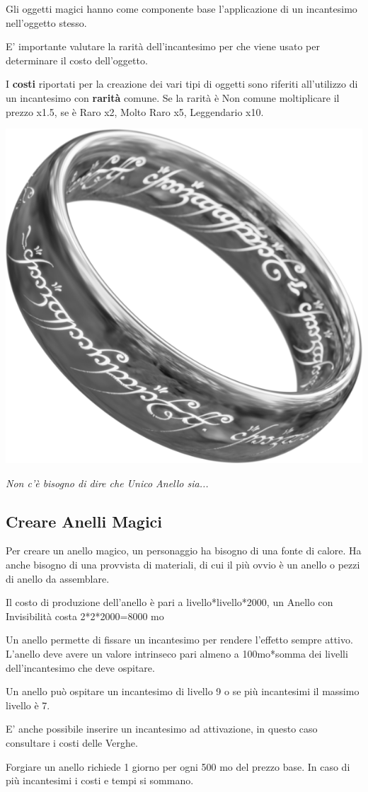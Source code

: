\begin{multicols}{2}
Gli oggetti magici hanno come componente base l'applicazione di un incantesimo nell'oggetto stesso.

E' importante valutare la rarità dell'incantesimo per che viene usato per determinare il costo dell'oggetto.

I \textbf{costi} riportati per la creazione dei vari tipi di oggetti sono riferiti all'utilizzo di un incantesimo con \textbf{rarità} comune. Se la rarità è Non comune moltiplicare il prezzo x1.5, se è Raro x2, Molto Raro x5, Leggendario x10.

\begin{center}
	\includegraphics[width=0.3\linewidth]{immagini/onering2.png}

	\emph{Non c'è bisogno di dire che Unico Anello sia...}
\end{center}

\subsection{Creare Anelli Magici}\label{creareanellimagici}

Per creare un anello magico, un personaggio ha bisogno di una fonte di calore. Ha anche bisogno di una provvista di materiali, di cui il più ovvio è un anello o pezzi di anello da assemblare.

Il costo di produzione dell'anello è pari a livello*livello*2000, un Anello con Invisibilità costa 2*2*2000=8000 mo

Un anello permette di fissare un incantesimo per rendere l'effetto sempre attivo.
L'anello deve avere un valore intrinseco pari almeno a 100mo*somma dei livelli dell'incantesimo che deve ospitare.

Un anello può ospitare un incantesimo di livello 9 o se più incantesimi il massimo livello è 7.

E' anche possibile inserire un incantesimo ad attivazione, in questo caso consultare i costi delle Verghe.

Forgiare un anello richiede 1 giorno per ogni 500 mo del prezzo base. In caso di più incantesimi i costi e tempi si sommano.


\end{multicols}
